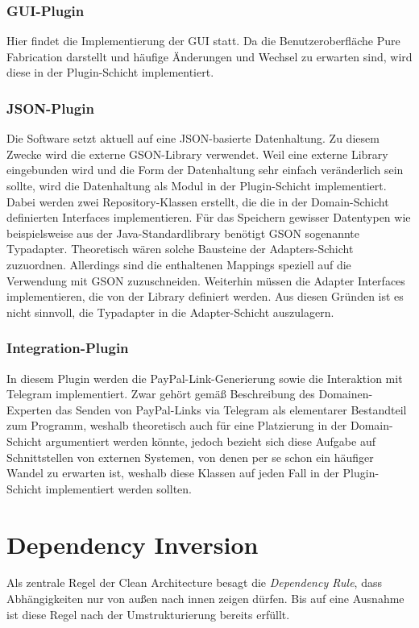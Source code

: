 \subsubsection{GUI-Plugin}
Hier findet die Implementierung der GUI statt.
Da die Benutzeroberfläche Pure Fabrication darstellt und häufige Änderungen und Wechsel zu erwarten sind, wird diese in der Plugin-Schicht implementiert.

\subsubsection{JSON-Plugin}
Die Software setzt aktuell auf eine JSON-basierte Datenhaltung.
Zu diesem Zwecke wird die externe GSON-Library verwendet.
Weil eine externe Library eingebunden wird und die Form der Datenhaltung sehr einfach veränderlich sein sollte, wird die Datenhaltung als Modul in der Plugin-Schicht implementiert.
Dabei werden zwei Repository-Klassen erstellt, die die in der Domain-Schicht definierten Interfaces implementieren.
Für das Speichern gewisser Datentypen wie beispielsweise  aus der Java-Standardlibrary benötigt GSON sogenannte Typadapter.
Theoretisch wären solche Bausteine der Adapters-Schicht zuzuordnen.
Allerdings sind die enthaltenen Mappings speziell auf die Verwendung mit GSON zuzuschneiden.
Weiterhin müssen die Adapter Interfaces implementieren, die von der Library definiert werden.
Aus diesen Gründen ist es nicht sinnvoll, die Typadapter in die Adapter-Schicht auszulagern.

\subsubsection{Integration-Plugin}
In diesem Plugin werden die PayPal-Link-Generierung sowie die Interaktion mit Telegram implementiert.
Zwar gehört gemäß Beschreibung des Domainen-Experten das Senden von PayPal-Links via Telegram als elementarer Bestandteil zum Programm, weshalb theoretisch auch für eine Platzierung in der Domain-Schicht argumentiert werden könnte, jedoch bezieht sich diese Aufgabe auf Schnittstellen von externen Systemen, von denen per se schon ein häufiger Wandel zu erwarten ist, weshalb diese Klassen auf jeden Fall in der Plugin-Schicht implementiert werden sollten.

\section{Dependency Inversion}
Als zentrale Regel der Clean Architecture besagt die \emph{Dependency Rule}, dass Abhängigkeiten nur von außen nach innen zeigen dürfen.
Bis auf eine Ausnahme ist diese Regel nach der Umstrukturierung bereits erfüllt.

